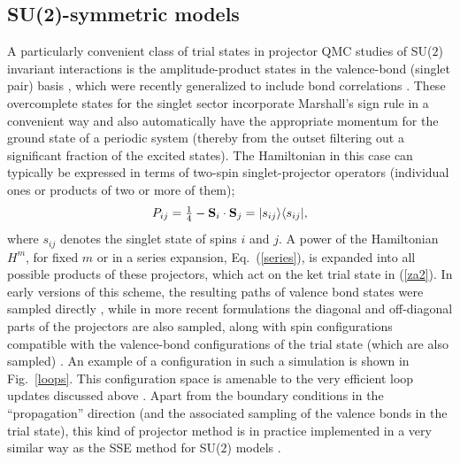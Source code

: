 \documentclass[range]{ar2e}
\begin{document}
\subsection{SU(2)-symmetric models}
\label{su2method}

A particularly convenient class of trial states in projector QMC studies of SU($2$) invariant interactions is the amplitude-product states in the valence-bond
(singlet pair) basis \cite{Liang88}, which were recently generalized to include bond correlations \cite{Lin12}. These overcomplete states for the singlet 
sector incorporate Marshall's sign rule in a convenient way and also automatically have the appropriate momentum for the ground state of a periodic system 
(thereby from the outset filtering out a significant fraction of the excited states). The Hamiltonian in this case can typically be expressed in terms of 
two-spin singlet-projector operators  (individual ones or products of two or more of them);
\begin{equation}
P_{ij}=\hbox{$\frac{1}{4}$}-{\bf S}_i\cdot {\bf S}_j = |s_{ij}\rangle\langle s_{ij}|,
\label{psinglet}
\end{equation}
where $s_{ij}$ denotes the singlet state of spins $i$ and $j$. A power of the Hamiltonian $H^m$, for fixed $m$ or in a series expansion, Eq.~(\ref{series}),
is expanded into all possible products of these projectors, which act on the ket trial state in (\ref{za2}). In early versions of this scheme, the resulting 
paths of valence bond states were sampled directly \cite{Liang90,Santoro99,Sandvik05}, while in more recent formulations the diagonal and off-diagonal parts of the 
projectors are also sampled, along with spin configurations compatible with the valence-bond configurations of the trial state (which are also sampled) 
\cite{Sandvik10c}. An example of a configuration in such a simulation is shown in Fig.~\ref{loops}. This configuration space is amenable to the very efficient 
loop updates discussed above \cite{Sandvik10a}. Apart from the boundary conditions in the ``propagation'' direction (and the associated sampling of the
valence bonds in the trial state), this kind of projector method is in practice implemented in a very similar way as the SSE method for SU($2$) 
models \cite{Sandvik10b}.
\end{document}
